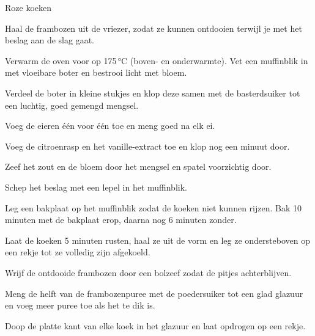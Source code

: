 \begin{recipe}{Roze koeken}
\begin{steps}
  \item Haal de frambozen uit de vriezer, zodat ze kunnen ontdooien terwijl je
        met het beslag aan de slag gaat.
  \item Verwarm de oven voor op 175\,°C (boven- en onderwarmte). Vet een muffinblik in met vloeibare boter en bestrooi
        licht met bloem.
  \item Verdeel de boter in kleine stukjes en klop deze samen met de basterdsuiker
        tot een luchtig, goed gemengd mengsel.
  \item Voeg de eieren één voor één toe en meng goed na elk ei.
  \item Voeg de citroenrasp en het vanille-extract toe en klop nog een minuut door.
  \item Zeef het zout en de bloem door het mengsel en spatel voorzichtig door.
  \item Schep het beslag met een lepel in het muffinblik.
  \item Leg een bakplaat op het muffinblik zodat de koeken niet kunnen rijzen. Bak
        10 minuten met de bakplaat erop, daarna nog 6 minuten zonder.
  \item Laat de koeken 5 minuten rusten, haal ze uit de vorm en leg ze
        ondersteboven op een rekje tot ze volledig zijn afgekoeld.
  \item Wrijf de ontdooide frambozen door een bolzeef zodat de pitjes achterblijven.
  \item Meng de helft van de frambozenpuree met de poedersuiker tot een glad
        glazuur en voeg meer puree toe als het te dik is.
  \item Doop de platte kant van elke koek in het glazuur en laat opdrogen op een rekje.
\end{steps}

\end{recipe}
